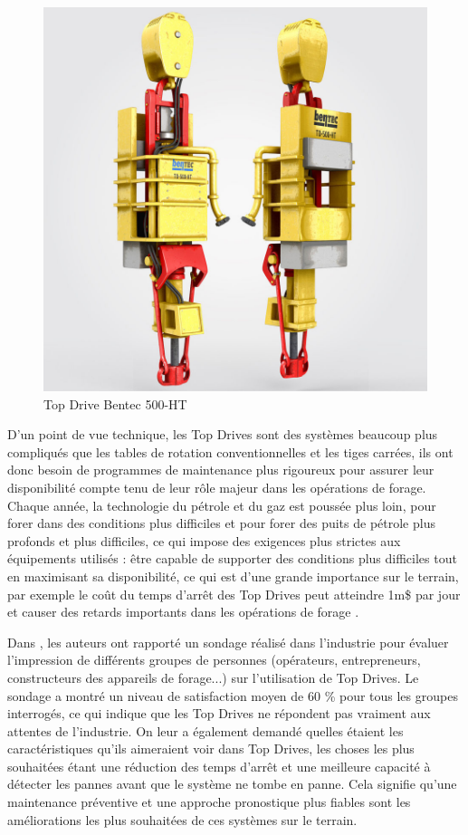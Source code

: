 \begin{figure}[h]
	\centering
	\includegraphics[width=0.9\linewidth]{figures/bentec_500_ht.jpg}
	\caption{Top Drive Bentec 500-HT}%
	\label{fig:figures/bentec_500_ht}
\end{figure}

D'un point de vue technique, les Top Drives sont des systèmes beaucoup plus compliqués que les tables de rotation conventionnelles et les tiges carrées, ils ont donc besoin de programmes de maintenance plus rigoureux pour assurer leur disponibilité compte tenu de leur rôle majeur dans les opérations de forage. Chaque année, la technologie du pétrole et du gaz est poussée plus loin, pour forer dans des conditions plus difficiles et pour forer des puits de pétrole plus profonds et plus difficiles, ce qui impose des exigences plus strictes aux équipements utilisés : être capable de supporter des conditions plus difficiles tout en maximisant sa disponibilité, ce qui est d'une grande importance sur le terrain, par exemple le coût du temps d'arrêt des Top Drives peut atteindre 1m\$ par jour et causer des retards importants dans les opérations de forage \cite{skfbrochure}.

Dans \cite{Pournazari2016}, les auteurs ont rapporté un sondage réalisé dans l'industrie pour évaluer l'impression de différents groupes de personnes (opérateurs, entrepreneurs, constructeurs des appareils de forage...) sur l'utilisation de Top Drives. Le sondage a montré un niveau de satisfaction moyen de 60 \% pour tous les groupes interrogés, ce qui indique que les Top Drives ne répondent pas vraiment aux attentes de l'industrie. On leur a également demandé quelles étaient les caractéristiques qu'ils aimeraient voir dans Top Drives, les choses les plus souhaitées étant une réduction des temps d'arrêt et une meilleure capacité à détecter les pannes avant que le système ne tombe en panne. Cela signifie qu'une maintenance préventive et une approche pronostique plus fiables sont les améliorations les plus souhaitées de ces systèmes sur le terrain.

